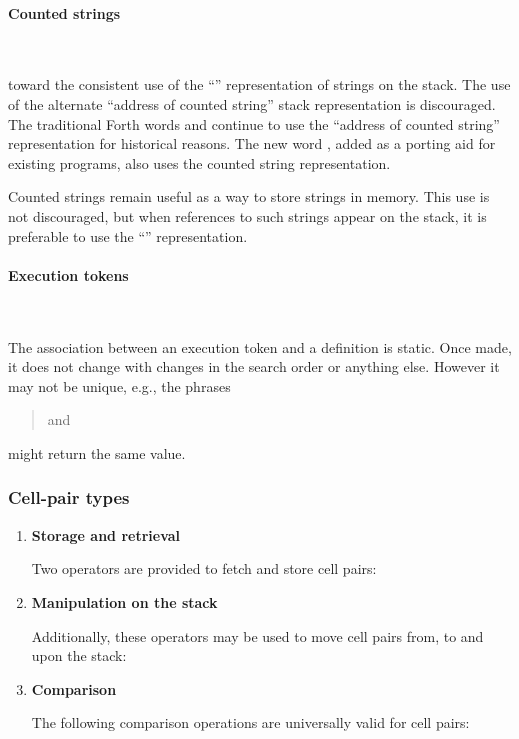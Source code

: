 \paragraph{Counted strings} ~ %
\label{rat:cstring}

 toward the consistent use of the
``'' representation of strings on the stack. The use
of the alternate ``address of counted string'' stack representation
is discouraged. The traditional Forth words  and 
continue to use the ``address of counted string'' representation for
historical reasons. The new word , added as a porting aid for
existing programs, also uses the counted string representation.

Counted strings remain useful as a way to store strings in memory.
This use is not discouraged, but when references to such strings
appear on the stack, it is preferable to use the ``''
representation.


\paragraph{Execution tokens} ~ %

The association between an execution token and a definition is static.
Once made, it does not change with changes in the search order or
anything else. However it may not be unique, e.g., the phrases
\begin{quote}\ttfamily
	  and \\
	 
\end{quote}
might return the same value.


\subsubsection{Cell-pair types} %

\begin{enumerate}
\item \textbf{Storage and retrieval}

	Two operators are provided to fetch and store cell pairs:
	\begin{quote}\ttfamily
			
	\end{quote}

\item \textbf{Manipulation on the stack}

	Additionally, these operators may be used to move cell pairs
	from, to and upon the stack:
	\begin{quote}\ttfamily
					
				
	\end{quote}

\item \textbf{Comparison}

	The following comparison operations are universally valid for
	cell pairs:
	\begin{quote}\ttfamily
			
	\end{quote}
\end{enumerate}


